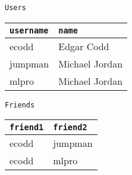 \begin{center}
  \newcommand{\ttt}{\texttt}
  \begin{minipage}{0.1\colwidth}
    \hfill
  \end{minipage}%
  \begin{minipage}{0.45\colwidth}
    \ttt{Users}

    \vspace{12pt}

    \begin{tabular}{|l|l|}
      \hline
      \rowcolor{flatgray}
      \textbf{\ttt{username}} & \textbf{\ttt{name}} \\\hline
      ecodd                   & Edgar Codd \\
      jumpman                 & Michael Jordan \\
      mlpro                   & Michael Jordan \\\hline
    \end{tabular}
  \end{minipage}%
  \begin{minipage}{0.45\colwidth}
    \ttt{Friends}

    \vspace{12pt}

    \begin{tabular}{|l|l|}
      \hline
      \rowcolor{flatgray}
      \textbf{\ttt{friend1}} & \textbf{\ttt{friend2}} \\\hline
      ecodd                  & jumpman \\
      ecodd                  & mlpro \\\hline
    \end{tabular}
  \end{minipage}
\end{center}
